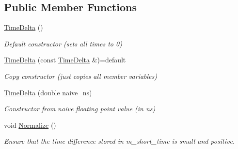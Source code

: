 \subsection*{Public Member Functions}
\begin{DoxyCompactItemize}
\item 
\hypertarget{classTimeDelta_a7ea75472b12ecb4cbbd6327a1627d334}{\hyperlink{classTimeDelta_a7ea75472b12ecb4cbbd6327a1627d334}{Time\-Delta} ()}\label{classTimeDelta_a7ea75472b12ecb4cbbd6327a1627d334}

\begin{DoxyCompactList}\small\item\em Default constructor (sets all times to 0) \end{DoxyCompactList}\item 
\hypertarget{classTimeDelta_a2efa569f8caa02d8229c81ffb8905a17}{\hyperlink{classTimeDelta_a2efa569f8caa02d8229c81ffb8905a17}{Time\-Delta} (const \hyperlink{classTimeDelta}{Time\-Delta} \&)=default}\label{classTimeDelta_a2efa569f8caa02d8229c81ffb8905a17}

\begin{DoxyCompactList}\small\item\em Copy constructor (just copies all member variables) \end{DoxyCompactList}\item 
\hypertarget{classTimeDelta_a4e1bf5f12a59a250a8a947b1fc60ef1a}{\hyperlink{classTimeDelta_a4e1bf5f12a59a250a8a947b1fc60ef1a}{Time\-Delta} (double naive\-\_\-ns)}\label{classTimeDelta_a4e1bf5f12a59a250a8a947b1fc60ef1a}

\begin{DoxyCompactList}\small\item\em Constructor from naive floating point value (in ns) \end{DoxyCompactList}\item 
\hypertarget{classTimeDelta_a5b48188f53b39792626cac33924a3e85}{void \hyperlink{classTimeDelta_a5b48188f53b39792626cac33924a3e85}{Normalize} ()}\label{classTimeDelta_a5b48188f53b39792626cac33924a3e85}

\begin{DoxyCompactList}\small\item\em Ensure that the time difference stored in m\-\_\-short\-\_\-time is small and positive. \end{DoxyCompactList}\end{DoxyCompactItemize}
